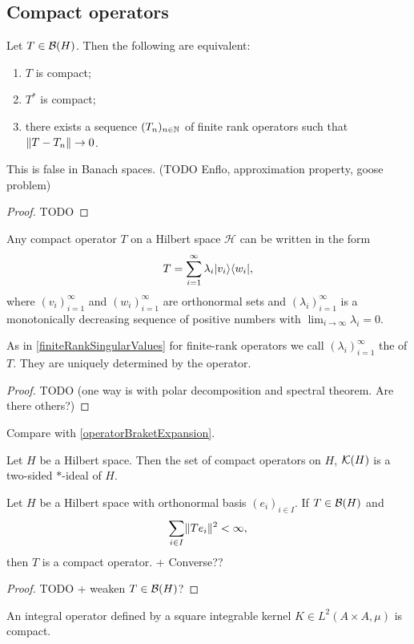 \subsection{Compact operators}
\begin{proposition}
Let $T\in\operatorname{\mathcal{B}}(H)$. Then the following are equivalent:
\begin{enumerate}
\item $T$ is compact;
\item $T^*$ is compact;
\item there exists a sequence $(T_n)_{n\in\mathbb{N}}$ of finite rank operators such that $\lVert T-T_n\rVert\to 0$.
\end{enumerate}
\end{proposition}
This is false in Banach spaces. (TODO Enflo, approximation property, goose problem)
\begin{proof}
TODO
\end{proof}
\begin{corollary}
Any compact operator $T$ on a Hilbert space $\mathcal{H}$ can be written in the form
\[ T = \sum_{i=1}^\infty \lambda_i |v_i\rangle\langle w_i|, \]
where $(v_i)_{i=1}^\infty$ and $(w_i)_{i=1}^\infty$ are orthonormal sets and $(\lambda_i)_{i=1}^\infty$ is a monotonically decreasing sequence of positive numbers with $\lim_{i\to\infty}\lambda_i = 0$.
\end{corollary}
As in \ref{finiteRankSingularValues} for finite-rank operators we call $(\lambda_i)_{i=1}^\infty$ the  of $T$. They are uniquely determined by the operator.
\begin{proof}
TODO (one way is with polar decomposition and spectral theorem. Are there others?)
\end{proof}
Compare with \ref{operatorBraketExpansion}.

\begin{lemma}
Let $H$ be a Hilbert space. Then the set of compact operators on $H$, $\operatorname{\mathcal{K}}(H)$ is a two-sided $*$-ideal of $H$. 
\end{lemma}

\begin{proposition}
Let $H$ be a Hilbert space with orthonormal basis $(e_i)_{i\in I}$. If $T\in\operatorname{\mathcal{B}}(H)$ and
\[ \sum_{i\in I}\lVert Te_i\rVert^2  < \infty, \]
then $T$ is a compact operator. + Converse??
\end{proposition}
\begin{proof}
TODO + weaken $T\in\operatorname{\mathcal{B}}(H)$?
\end{proof}
\begin{corollary}
An integral operator defined by a square integrable kernel $K\in L^2(A\times A, \mu)$ is compact.
\end{corollary}

